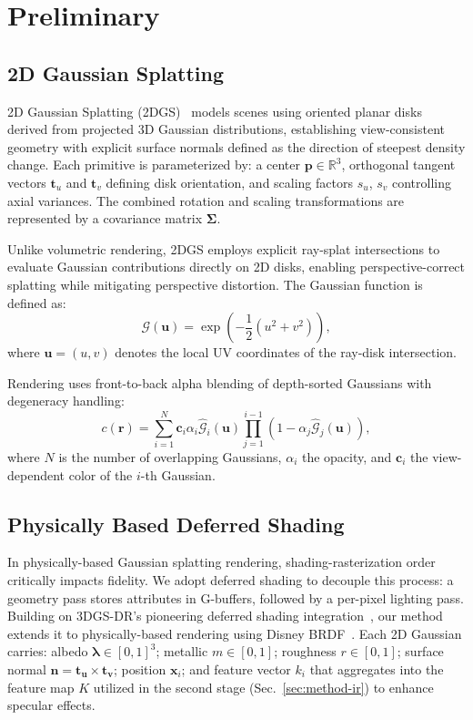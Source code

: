 \vspace{-0.7em}
\section{Preliminary}
\label{sec:prelim}
\subsection{2D Gaussian Splatting}
2D Gaussian Splatting (2DGS)~\cite{huang20242dgs} models scenes using oriented planar disks derived from projected 3D Gaussian distributions, establishing view-consistent geometry with explicit surface normals defined as the direction of steepest density change. Each primitive is parameterized by: a center $\boldsymbol{p} \in \mathbb{R}^3$, orthogonal tangent vectors $\boldsymbol{t}_u$ and $\boldsymbol{t}_v$ defining disk orientation, and scaling factors $s_u$, $s_v$ controlling axial variances. The combined rotation and scaling transformations are represented by a covariance matrix $\boldsymbol{\Sigma}$.

Unlike volumetric rendering, 2DGS employs explicit ray-splat intersections to evaluate Gaussian contributions directly on 2D disks, enabling perspective-correct splatting while mitigating perspective distortion. The Gaussian function is defined as:
\begin{equation}
\label{eq:2dgs}
\mathcal{G}(\boldsymbol{u}) = \exp\left(-\frac{1}{2}(u^2 + v^2)\right),
\end{equation}
where $\boldsymbol{u} = (u, v)$ denotes the local UV coordinates of the ray-disk intersection.

Rendering uses front-to-back alpha blending of depth-sorted Gaussians with degeneracy handling:
\begin{equation}
\label{eq:splatting}
c(\boldsymbol{r}) = \sum_{i=1}^{N} \boldsymbol{c}_i \alpha_i \hat{\mathcal{G}}_i(\boldsymbol{u}) \prod_{j=1}^{i-1} \left(1 - \alpha_j \hat{\mathcal{G}}_j(\boldsymbol{u})\right),
\end{equation}
where $N$ is the number of overlapping Gaussians, $\alpha_i$ the opacity, and $\boldsymbol{c}_i$ the view-dependent color of the $i$-th Gaussian.
\subsection{Physically Based Deferred Shading}
In physically-based Gaussian splatting rendering, shading-rasterization order critically impacts fidelity. We adopt deferred shading to decouple this process: a geometry pass stores attributes in G-buffers, followed by a per-pixel lighting pass. Building on 3DGS-DR's pioneering deferred shading integration~\cite{ye20243dgsdr}, our method extends it to physically-based rendering using Disney BRDF~\cite{burley2012physically}. Each 2D Gaussian carries: albedo $\boldsymbol{\lambda} \in [0,1]^3$; metallic $m \in [0,1]$; roughness $r \in [0,1]$; surface normal $\boldsymbol{n} = \boldsymbol{t_u} \times \boldsymbol{t_v}$; position $\boldsymbol{x}_i$; and feature vector $k_i$ that aggregates into the feature map $K$ utilized in the second stage (Sec.~\ref{sec:method-ir}) to enhance specular effects.


